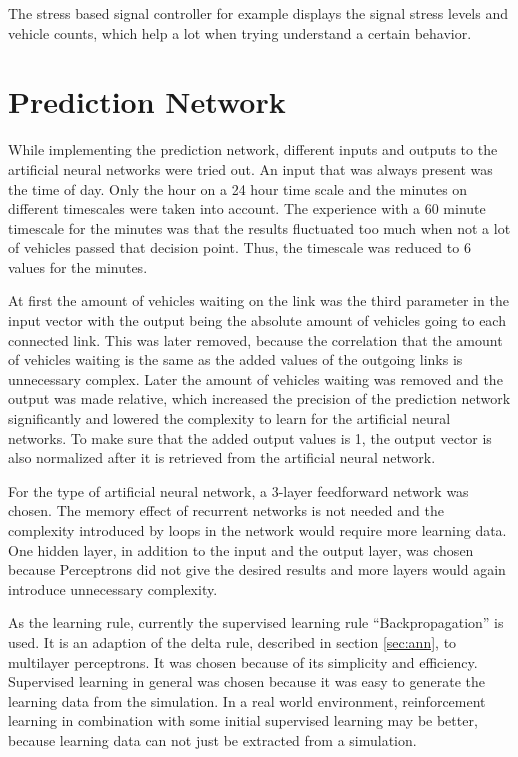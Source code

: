 The stress based signal controller for example displays the signal stress levels and vehicle counts, which help a lot when trying understand a certain behavior.

\section{Prediction Network}

While implementing the prediction network, different inputs and outputs to the artificial neural networks were tried out. An input that was always present was the time of day. Only the hour on a 24 hour time scale and the minutes on different timescales were taken into account. The experience with a 60 minute timescale for the minutes was that the results fluctuated too much when not a lot of vehicles passed that decision point. Thus, the timescale was reduced to 6 values for the minutes.

At first the amount of vehicles waiting on the link was the third parameter in the input vector with the output being the absolute amount of vehicles going to each connected link. This was later removed, because the correlation that the amount of vehicles waiting is the same as the added values of the outgoing links is unnecessary complex. Later the amount of vehicles waiting was removed and the output was made relative, which increased the precision of the prediction network significantly and lowered the complexity to learn for the artificial neural networks. To make sure that the added output values is 1, the output vector is also normalized after it is retrieved from the artificial neural network.

For the type of artificial neural network, a 3-layer feedforward network was chosen. The memory effect of recurrent networks is not needed and the complexity introduced by loops in the network would require more learning data. One hidden layer, in addition to the input and the output layer, was chosen because Perceptrons did not give the desired results and more layers would again introduce unnecessary complexity.

As the learning rule, currently the supervised learning rule ``Backpropagation'' is used. It is an adaption of the delta rule, described in section \ref{sec:ann}, to multilayer perceptrons. It was chosen because of its simplicity and efficiency. Supervised learning in general was chosen because it was easy to generate the learning data from the simulation. In a real world environment, reinforcement learning in combination with some initial supervised learning may be better, because learning data can not just be extracted from a simulation.

